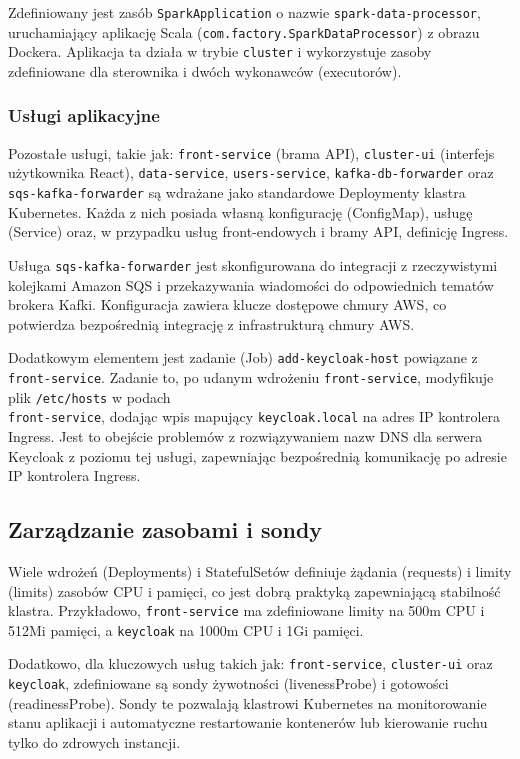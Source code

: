 Zdefiniowany jest zasób \texttt{SparkApplication} o nazwie \texttt{spark-data-processor}, uruchamiający aplikację Scala (\texttt{com.factory.SparkDataProcessor}) z obrazu Dockera. Aplikacja ta działa w trybie \texttt{cluster} i wykorzystuje zasoby zdefiniowane dla sterownika i dwóch wykonawców (executorów).

\subsubsection{Usługi aplikacyjne}
Pozostałe usługi, takie jak: \texttt{front-service} (brama API), \texttt{cluster-ui} (interfejs użytkownika React), \texttt{data-service}, \texttt{users-service}, \texttt{kafka-db-forwarder} oraz \texttt{sqs-kafka-forwarder} są wdrażane jako standardowe Deploymenty klastra Kubernetes. Każda z nich posiada własną konfigurację (ConfigMap), usługę (Service) oraz, w przypadku usług front-endowych i bramy API, definicję Ingress.

Usługa \texttt{sqs-kafka-forwarder} jest skonfigurowana do integracji z rzeczywistymi kolejkami Amazon SQS i przekazywania wiadomości do odpowiednich tematów brokera Kafki. Konfiguracja zawiera klucze dostępowe chmury AWS, co potwierdza bezpośrednią integrację z infrastrukturą chmury AWS.

Dodatkowym elementem jest zadanie (Job) \texttt{add-keycloak-host} powiązane z \texttt{front-service}. Zadanie to, po udanym wdrożeniu \texttt{front-service}, modyfikuje plik \texttt{/etc/hosts} w podach \\ \texttt{front-service}, dodając wpis mapujący \texttt{keycloak.local} na adres IP kontrolera Ingress. Jest to obejście problemów z rozwiązywaniem nazw DNS dla serwera Keycloak z poziomu tej usługi, zapewniając bezpośrednią komunikację po adresie IP kontrolera Ingress.

\subsection{Zarządzanie zasobami i sondy}
\label{sub:zasoby_sondy}
Wiele wdrożeń (Deployments) i StatefulSetów definiuje żądania (requests) i limity (limits) zasobów CPU i pamięci, co jest dobrą praktyką zapewniającą stabilność klastra. Przykładowo, \texttt{front-service} ma zdefiniowane limity na 500m CPU i 512Mi pamięci, a \texttt{keycloak} na 1000m CPU i 1Gi pamięci.

Dodatkowo, dla kluczowych usług takich jak: \texttt{front-service}, \texttt{cluster-ui} oraz \texttt{keycloak}, zdefiniowane są sondy żywotności (livenessProbe) i gotowości (readinessProbe). Sondy te pozwalają klastrowi Kubernetes na monitorowanie stanu aplikacji i automatyczne restartowanie kontenerów lub kierowanie ruchu tylko do zdrowych instancji.
